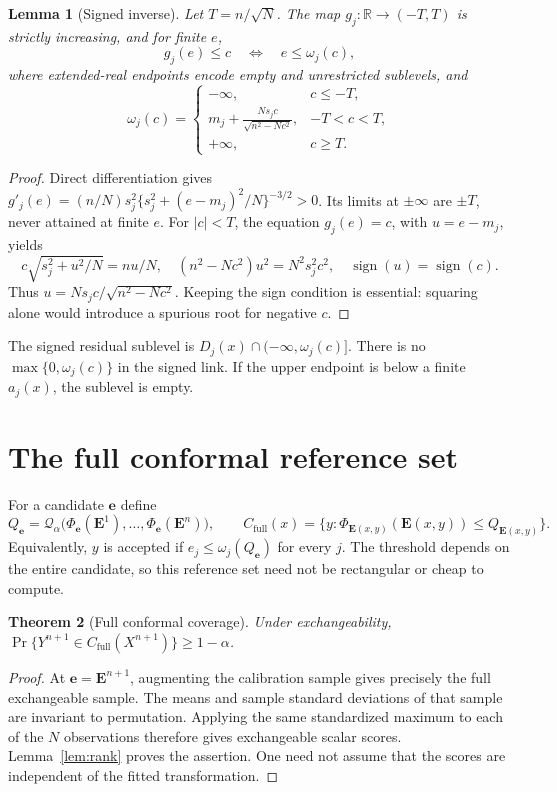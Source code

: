 \documentclass[11pt]{article}
\newtheorem{theorem}{Theorem}[section]
\newtheorem{lemma}[theorem]{Lemma}
\newcommand{\R}{\mathbb R}
\newcommand{\E}{\mathbf E}
\newcommand{\evec}{\mathbf e}
\newcommand{\Q}{\mathcal Q_\alpha}
\begin{document}
\begin{lemma}[Signed inverse]\label{lem:link}
Let $T=n/\sqrt N$. The map $g_j:\R\to(-T,T)$ is strictly increasing, and
for finite $e$,
\begin{equation}\label{eq:linkequiv}
 g_j(e)\le c\quad\Longleftrightarrow\quad e\le\omega_j(c),
\end{equation}
where extended-real endpoints encode empty and unrestricted sublevels, and
\begin{equation}\label{eq:omega}
 \omega_j(c)=
 \begin{cases}
 -\infty,&c\le-T,\\[2pt]
 m_j+\displaystyle\frac{Ns_jc}{\sqrt{n^2-Nc^2}},&-T<c<T,\\[6pt]
 +\infty,&c\ge T.
 \end{cases}
\end{equation}
\end{lemma}
\begin{proof}
Direct differentiation gives
$g'_j(e)=(n/N)s_j^2\{s_j^2+(e-m_j)^2/N\}^{-3/2}>0$.
Its limits at $\pm\infty$ are $\pm T$, never attained at finite $e$.
For $|c|<T$, the equation $g_j(e)=c$, with $u=e-m_j$, yields
\[
 c\sqrt{s_j^2+u^2/N}=nu/N,
 \quad (n^2-Nc^2)u^2=N^2s_j^2c^2,
 \quad \operatorname{sign}(u)=\operatorname{sign}(c).
\]
Thus $u=Ns_jc/\sqrt{n^2-Nc^2}$. Keeping the sign condition is essential:
squaring alone would introduce a spurious root for negative $c$.
\end{proof}
The signed residual sublevel is $D_j(x)\cap(-\infty,\omega_j(c)]$.
There is no $\max\{0,\omega_j(c)\}$ in the signed link. If the upper endpoint
is below a finite $a_j(x)$, the sublevel is empty.

\section{The full conformal reference set}
For a candidate $\evec$ define
\begin{equation}\label{eq:oracle}
 Q_{\evec}=\Q\big(\Phi_{\evec}(\E^1),\ldots,
                          \Phi_{\evec}(\E^n)\big),\qquad
 C_{\mathrm{full}}(x)=\{y:\Phi_{\E(x,y)}(\E(x,y))\le Q_{\E(x,y)}\}.
\end{equation}
Equivalently, $y$ is accepted if $e_j\le\omega_j(Q_{\evec})$ for every $j$.
The threshold depends on the entire candidate, so this reference set need not
be rectangular or cheap to compute.

\begin{theorem}[Full conformal coverage]\label{thm:full}
Under exchangeability, $\Pr\{Y^{n+1}\in C_{\mathrm{full}}(X^{n+1})\}
\ge1-\alpha$.
\end{theorem}
\begin{proof}
At $\evec=\E^{n+1}$, augmenting the calibration sample gives precisely the full
exchangeable sample. The means and sample standard deviations of that sample
are invariant to permutation. Applying the same standardized maximum to each
of the $N$ observations therefore gives exchangeable scalar scores.
Lemma~\ref{lem:rank} proves the assertion. One need not assume that the scores
are independent of the fitted transformation.
\end{proof}
\end{document}
